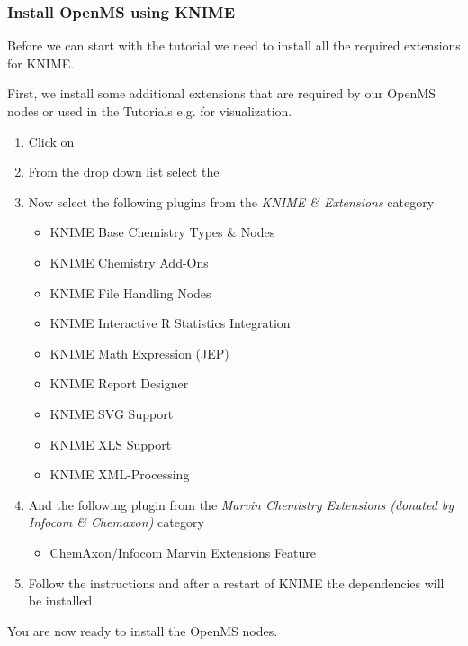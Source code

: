 % 
%

\subsubsection{Install OpenMS using KNIME}

Before we can start with the tutorial we need to install all the required extensions for KNIME.

First, we install some additional extensions that are required by our OpenMS nodes or used in the Tutorials e.g. for visualization.
\begin{enumerate}
\item Click on 
\item From the  drop down list select the 
\item Now select the following plugins from the \textit{KNIME \& Extensions} category
    \begin{itemize}
    \item KNIME Base Chemistry Types \& Nodes
    \item KNIME Chemistry Add-Ons
    \item KNIME File Handling Nodes
    \item KNIME Interactive R Statistics Integration
    \item KNIME Math Expression (JEP)
    \item KNIME Report Designer
    \item KNIME SVG Support
    \item KNIME XLS Support
    \item KNIME XML-Processing
    \end{itemize}
\item And the following plugin from the \textit{Marvin Chemistry Extensions (donated by Infocom \& Chemaxon)} category
    \begin{itemize}
    \item ChemAxon/Infocom Marvin Extensions Feature
    \end{itemize}
\item Follow the instructions and after a restart of KNIME the dependencies will be installed.
\end{enumerate}

You are now ready to install the OpenMS nodes.

